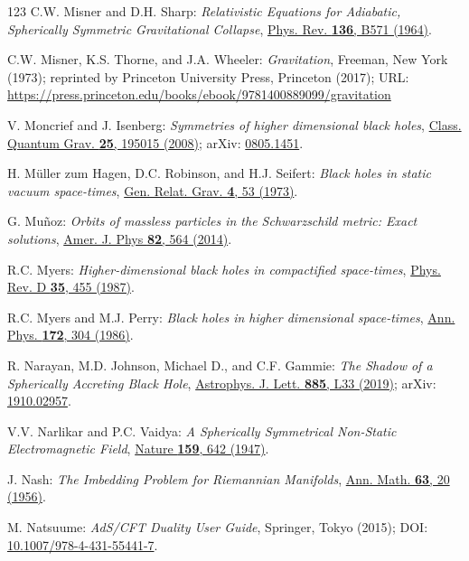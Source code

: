 \begin{thebibliography}{123}
C.W. Misner and D.H. Sharp:
{\em Relativistic Equations for Adiabatic, Spherically Symmetric Gravitational Collapse},
\href{https://doi.org/10.1103/PhysRev.136.B571}{Phys. Rev. {\bf 136}, B571 (1964)}.

C.W. Misner, K.S. Thorne, and J.A. Wheeler:
{\em Gravitation},
Freeman, New York (1973);
reprinted by Princeton University Press, Princeton (2017);
URL: \url{https://press.princeton.edu/books/ebook/9781400889099/gravitation}

V. Moncrief and J. Isenberg:
{\em Symmetries of higher dimensional black holes},
\href{https://doi.org/10.1088/0264-9381/25/19/195015}{Class. Quantum Grav. {\bf 25}, 195015 (2008)};
arXiv: \href{https://arxiv.org/abs/0805.1451}{0805.1451}.

H. Müller zum Hagen, D.C. Robinson, and H.J. Seifert:
{\em Black holes in static vacuum space-times},
\href{https://doi.org/10.1007/BF00769760}{Gen. Relat. Grav. {\bf 4}, 53 (1973)}.

G. Mu\~noz:
{\em Orbits of massless particles in the Schwarzschild metric: Exact solutions},
\href{https://doi.org/10.1119/1.4866274}{Amer. J. Phys {\bf 82}, 564 (2014)}.

R.C. Myers:
{\em Higher-dimensional black holes in compactified space-times},
\href{https://doi.org/10.1103/PhysRevD.35.455}{Phys. Rev. D {\bf 35}, 455 (1987)}.

R.C. Myers and M.J. Perry:
{\em Black holes in higher dimensional space-times},
\href{https://doi.org/10.1016/0003-4916(86)90186-7}{Ann. Phys. {\bf 172}, 304 (1986)}.

R. Narayan, M.D. Johnson, Michael D., and C.F. Gammie:
{\em The Shadow of a Spherically Accreting Black Hole},
\href{https://doi.org/10.3847/2041-8213/ab518c}{Astrophys. J. Lett. {\bf 885}, L33 (2019)};
arXiv: \href{https://arxiv.org/abs/1910.02957}{1910.02957}.

V.V. Narlikar and P.C. Vaidya:
{\em A Spherically Symmetrical Non-Static Electromagnetic Field},
\href{https://doi.org/10.1038/159642a0}{Nature {\bf 159}, 642 (1947)}.

J. Nash:
{\em The Imbedding Problem for Riemannian Manifolds},
\href{https://doi.org/10.2307/1969989}{Ann. Math. {\bf 63}, 20 (1956)}.

M. Natsuume:
{\em AdS/CFT Duality User Guide},
Springer, Tokyo (2015);
DOI: \href{https://doi.org/10.1007/978-4-431-55441-7}{10.1007/978-4-431-55441-7}.


\end{thebibliography}

